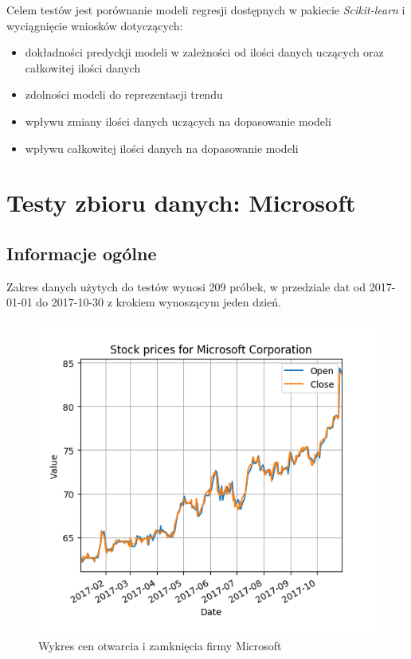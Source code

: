 Celem testów jest porównanie modeli regresji dostępnych w pakiecie \textit{Scikit-learn} i wyciągnięcie wniosków dotyczących:
\begin{itemize}
 \item dokładności predyckji modeli w zależności od ilości danych uczących oraz całkowitej ilości danych
 \item zdolności modeli do reprezentacji trendu
 \item wpływu zmiany ilości danych uczących na dopasowanie modeli
 \item wpływu całkowitej ilości danych na dopasowanie modeli
\end{itemize}

\section{Testy zbioru danych: Microsoft}

\subsection{Informacje ogólne}
Zakres danych użytych do testów wynosi 209 próbek, w przedziale dat od 2017-01-01 do 2017-10-30 z krokiem wynoszącym jeden dzień.\\

\begin{figure}[h!]
\centering
\includegraphics[width=150mm]{pictures/plots/microsoft_oc_price.png}
\caption{Wykres cen otwarcia i zamknięcia firmy Microsoft}
\label{fig:Wykres cen otwarcia i zamknięcia Microsoft}
\end{figure}

